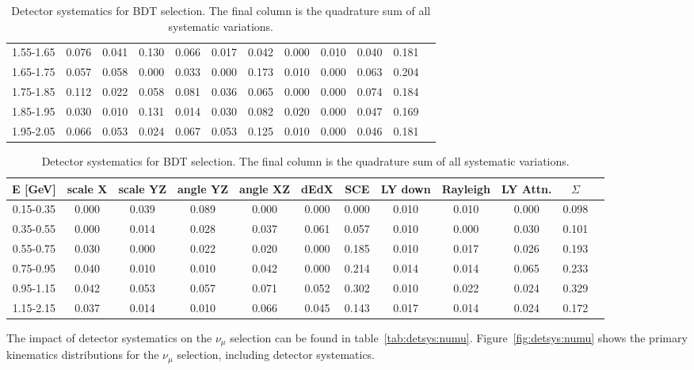 \begin{table}[H]
\begin{tabular}{| c | c | c | c | c | c | c | c | c | c | c | c |}
1.55-1.65 & 0.076 & 0.041 & 0.130 & 0.066 & 0.017 & 0.042 & 0.000 & 0.010 & 0.040 &  0.181 \\
1.65-1.75 & 0.057 & 0.058 & 0.000 & 0.033 & 0.000 & 0.173 & 0.010 & 0.000 & 0.063 &  0.204 \\
1.75-1.85 & 0.112 & 0.022 & 0.058 & 0.081 & 0.036 & 0.065 & 0.000 & 0.000 & 0.074 &  0.184 \\
1.85-1.95 & 0.030 & 0.010 & 0.131 & 0.014 & 0.030 & 0.082 & 0.020 & 0.000 & 0.047 &  0.169 \\
1.95-2.05 & 0.066 & 0.053 & 0.024 & 0.067 & 0.053 & 0.125 & 0.010 & 0.000 & 0.046 &  0.181 \\
 \hline
 \end{tabular}
 \caption{\label{tab:detsys:nue:np:BDT} Detector systematics for BDT \npsel selection. The final column is the quadrature sum of all systematic variations.}
\end{table}



\begin{table}[H]
\centering
\small
\setlength{\tabcolsep}{3pt}
\renewcommand{\arraystretch}{1.25}
 \begin{tabular}{| c | c | c | c | c | c | c | c | c | c | c | c |} 
 \hline
E [GeV] & scale X & scale YZ & angle YZ & angle XZ & dEdX & SCE & LY down & Rayleigh & LY Attn. & $\Sigma$ \\ \hline
0.15-0.35 & 0.000 & 0.039 & 0.089 & 0.000 & 0.000 & 0.000 & 0.010 & 0.010 & 0.000 &  0.098 \\
0.35-0.55 & 0.000 & 0.014 & 0.028 & 0.037 & 0.061 & 0.057 & 0.010 & 0.000 & 0.030 &  0.101 \\
0.55-0.75 & 0.030 & 0.000 & 0.022 & 0.020 & 0.000 & 0.185 & 0.010 & 0.017 & 0.026 &  0.193 \\
0.75-0.95 & 0.040 & 0.010 & 0.010 & 0.042 & 0.000 & 0.214 & 0.014 & 0.014 & 0.065 &  0.233 \\
0.95-1.15 & 0.042 & 0.053 & 0.057 & 0.071 & 0.052 & 0.302 & 0.010 & 0.022 & 0.024 &  0.329 \\
1.15-2.15 & 0.037 & 0.014 & 0.010 & 0.066 & 0.045 & 0.143 & 0.017 & 0.014 & 0.024 & 0.172 \\
 \hline
 \end{tabular}
 \caption{\label{tab:detsys:nue:zp:BDT} Detector systematics for BDT \zpsel selection. The final column is the quadrature sum of all systematic variations.}
\end{table}



\par The impact of detector systematics on the $\nu_{\mu}$ selection can be found in table~\ref{tab:detsys:numu}. Figure~\ref{fig:detsys:numu} shows the primary kinematics distributions for the $\nu_{\mu}$ selection, including detector systematics.

